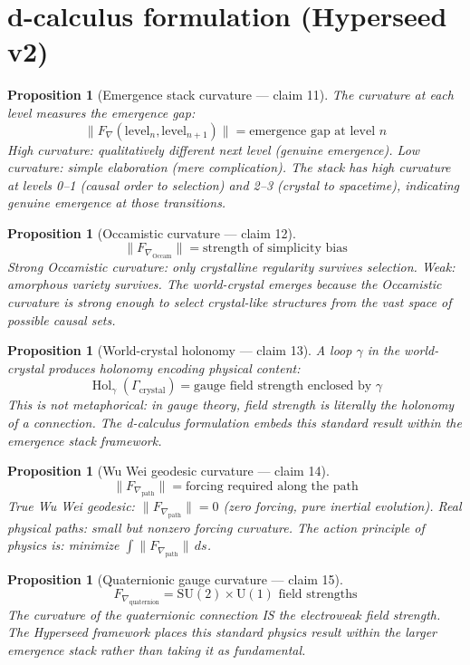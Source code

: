 \documentclass[11pt,a4paper]{article}
\newtheorem{proposition}[definition]{Proposition}
\begin{document}
\section{d-calculus formulation (Hyperseed v2)}

\begin{proposition}[Emergence stack curvature --- claim 11]
\label{prop:emergence}
The curvature at each level measures the emergence gap:
\[
  \|F_\nabla(\text{level}_n, \text{level}_{n+1})\| =
    \text{emergence gap at level } n
\]
High curvature: qualitatively different next level (genuine emergence).
Low curvature: simple elaboration (mere complication). The stack has
high curvature at levels 0--1 (causal order to selection) and 2--3
(crystal to spacetime), indicating genuine emergence at those transitions.
\end{proposition}

\begin{proposition}[Occamistic curvature --- claim 12]
\label{prop:occam_curv}
\[
  \|F_{\nabla_\text{Occam}}\| = \text{strength of simplicity bias}
\]
Strong Occamistic curvature: only crystalline regularity survives
selection. Weak: amorphous variety survives. The world-crystal emerges
because the Occamistic curvature is strong enough to select crystal-like
structures from the vast space of possible causal sets.
\end{proposition}

\begin{proposition}[World-crystal holonomy --- claim 13]
\label{prop:holonomy}
A loop $\gamma$ in the world-crystal produces holonomy encoding
physical content:
\[
  \operatorname{Hol}_\gamma(\Gamma_\text{crystal}) = \text{gauge field
    strength enclosed by } \gamma
\]
This is not metaphorical: in gauge theory, field strength is literally
the holonomy of a connection. The d-calculus formulation embeds this
standard result within the emergence stack framework.
\end{proposition}

\begin{proposition}[Wu Wei geodesic curvature --- claim 14]
\label{prop:wuwei_curv}
\[
  \|F_{\nabla_\text{path}}\| = \text{forcing required along the path}
\]
True Wu Wei geodesic: $\|F_{\nabla_\text{path}}\| = 0$ (zero forcing,
pure inertial evolution). Real physical paths: small but nonzero forcing
curvature. The action principle of physics is: minimize
$\int \|F_{\nabla_\text{path}}\|\, ds$.
\end{proposition}

\begin{proposition}[Quaternionic gauge curvature --- claim 15]
\label{prop:gauge}
\[
  F_{\nabla_\text{quaternion}} = \text{SU}(2) \times \text{U}(1)
    \text{ field strengths}
\]
The curvature of the quaternionic connection IS the electroweak field
strength. The Hyperseed framework places this standard physics result
within the larger emergence stack rather than taking it as fundamental.
\end{proposition}
\end{document}
